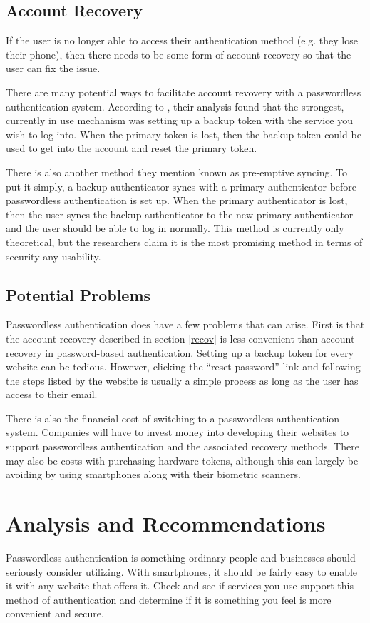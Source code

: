 \documentclass[12pt, letterpaper]{article}
\begin{document}
\subsection{Account Recovery\label{recov}}
If the user is no longer able to access their authentication method (e.g. they lose their phone), then there needs to be some form of account recovery so that the user can fix the issue.

There are many potential ways to facilitate account revovery with a passwordless authentication system.
According to \parencite{kunke2021evaluation}, their analysis found that the strongest, currently in use mechanism was setting up a backup token with the service you wish to log into.
When the primary token is lost, then the backup token could be used to get into the account and reset the primary token.

There is also another method they mention known as pre-emptive syncing.
To put it simply, a backup authenticator syncs with a primary authenticator before passwordless authentication is set up.
When the primary authenticator is lost, then the user syncs the backup authenticator to the new primary authenticator and the user should be able to log in normally.
This method is currently only theoretical, but the researchers claim it is the most promising method in terms of security any usability.

\subsection{Potential Problems}
Passwordless authentication does have a few problems that can arise.
First is that the account recovery described in section \ref{recov} is less convenient than account recovery in password-based authentication.
Setting up a backup token for every website can be tedious.
However, clicking the ``reset password'' link and following the steps listed by the website is usually a simple process as long as the user has access to their email.

There is also the financial cost of switching to a passwordless authentication system.
Companies will have to invest money into developing their websites to support passwordless authentication and the associated recovery methods.
There may also be costs with purchasing hardware tokens, although this can largely be avoiding by using smartphones along with their biometric scanners.
\newpage
\section{Analysis and Recommendations}
Passwordless authentication is something ordinary people and businesses should seriously consider utilizing.
With smartphones, it should be fairly easy to enable it with any website that offers it.
Check and see if services you use support this method of authentication and determine if it is something you feel is more convenient and secure.
\end{document}
